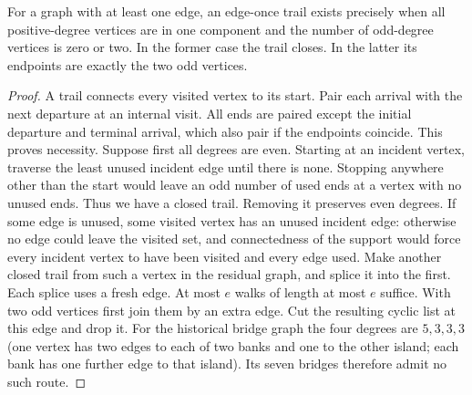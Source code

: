 \begin{theorem}\label{idx-algebraic29}
For a graph with at least one edge, an edge-once trail exists precisely
when all positive-degree vertices are in one component and the number of
odd-degree vertices is zero or two. In the former case the trail closes.
In the latter its endpoints are exactly the two odd vertices.
\end{theorem}
\begin{proof}
A trail connects every visited vertex to its start. Pair each arrival with
the next departure at an internal visit. All ends are paired except the
initial departure and terminal arrival, which also pair if the endpoints
coincide. This proves necessity. Suppose first all degrees are even.
Starting at an incident vertex, traverse the least unused incident edge
until there is none. Stopping anywhere other than the start would leave an
odd number of used ends at a vertex with no unused ends. Thus we have a
closed trail. Removing it preserves even degrees. If some edge is unused,
some visited vertex has an unused incident edge: otherwise no edge could
leave the visited set, and connectedness of the support would force every
incident vertex to have been visited and every edge used. Make another
closed trail from such a vertex in the residual graph, and splice it into
the first. Each splice uses a fresh edge. At most $e$ walks of length at
most $e$ suffice. With two odd vertices first join them by an extra edge.
Cut the resulting cyclic list at this edge and drop it. For the historical
bridge graph the four degrees are $5,3,3,3$ (one vertex has two edges to
each of two banks and one to the other island; each bank has one further
edge to that island). Its seven bridges therefore admit no such route.
\end{proof}

